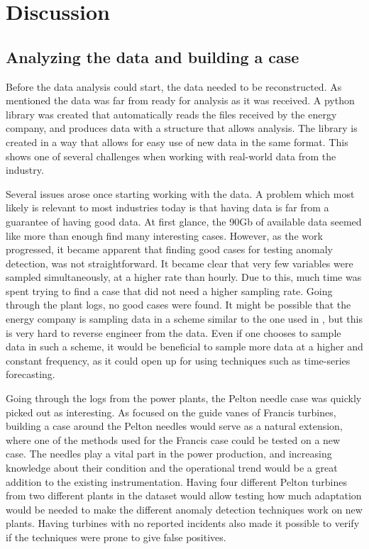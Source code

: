 \chapter{Discussion}\label{cha:discussion}

\section{Analyzing the data and building a case}
    Before the data analysis could start, the data needed to be reconstructed. As mentioned the data was far from ready for analysis as it was received. A python library was created that automatically reads the files received by the energy company, and produces data with a structure that allows analysis. The library is created in a way that allows for easy use of new data in the same format. This shows one of several challenges when working with real-world data from the industry.    
    
    Several issues arose once starting working with the data. A problem which most likely is relevant to most industries today is that having data is far from a guarantee of having good data. At first glance, the 90Gb of available data seemed like more than enough find many interesting cases. However, as the work progressed, it became apparent that finding good cases for testing anomaly detection, was not straightforward. It became clear that very few variables were sampled simultaneously, at a higher rate than hourly. Due to this, much time was spent trying to find a case that did not need a higher sampling rate. Going through the plant logs, no good cases were found. It might be possible that the energy company is sampling data in a scheme similar to the one used in \cite{Selak2014}, but this is very hard to reverse engineer from the data. Even if one chooses to sample data in such a scheme, it would be beneficial to sample more data at a higher and constant frequency, as it could open up for using techniques such as time-series forecasting. 
     
    Going through the logs from the power plants, the Pelton needle case was quickly picked out as interesting. As \cite{Aasnes2017} focused on the guide vanes of Francis turbines, building a case around the Pelton needles would serve as a natural extension, where one of the methods used for the Francis case could be tested on a new case. The needles play a vital part in the power production, and increasing knowledge about their condition and the operational trend would be a great addition to the existing instrumentation. Having four different Pelton turbines from two different plants in the dataset would allow testing how much adaptation would be needed to make the different anomaly detection techniques work on new plants. Having turbines with no reported incidents also made it possible to verify if the techniques were prone to give false positives.  
     
